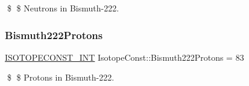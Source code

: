 \$ \$ Neutrons in Bismuth-\/222. \mbox{\label{group___isotope_const-_bismuth-_bi222_ga317608e9ce9f019407d7f49b6dd18f96}} 
\subsubsection{\texorpdfstring{Bismuth222\+Protons}{Bismuth222Protons}}
{\footnotesize\ttfamily \mbox{\hyperlink{group___isotope_const-_macros_ga5f18360b3e99483a35c32d789e62621c}{I\+S\+O\+T\+O\+P\+E\+C\+O\+N\+S\+T\+\_\+\+I\+NT}} Isotope\+Const\+::\+Bismuth222\+Protons = 83}

\$ \$ Protons in Bismuth-\/222. 